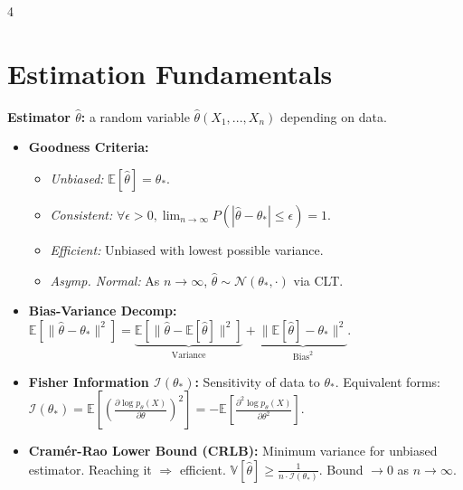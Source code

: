 \documentclass[9pt]{extarticle}
\begin{document}
\begin{multicols*}{4}
  
\section*{Estimation Fundamentals}
\textbf{Estimator $\hat{\theta}$:} a random variable $\hat{\theta}(X_1, ..., X_n)$ depending on data.
\begin{itemize}
    \item \textbf{Goodness Criteria:}
    \begin{itemize}
        \item \textit{Unbiased:} $\mathbb{E}[\hat{\theta}] = \theta_*$.
        \item \textit{Consistent:} $\forall \epsilon > 0, \lim_{n\to\infty}P(|\hat{\theta} - \theta_*|\leq\epsilon)=1$.
        \item \textit{Efficient:} Unbiased with lowest possible variance. 
        \item \textit{Asymp. Normal:} As $n\to\infty$, $\hat{\theta} \sim \mathcal{N}(\theta_*,\cdot)$ via CLT. 
    \end{itemize}
    \item \textbf{Bias-Variance Decomp:} 
    $\mathbb{E}[\|\hat{\theta} - \theta_*\|^2] = \underbrace{\mathbb{E}[\|\hat{\theta} - \mathbb{E}[\hat{\theta}]\|^2]}_{\text{Variance}} + \underbrace{\|\mathbb{E}[\hat{\theta}] - \theta_*\|^2}_{\text{Bias}^2}$.
    \item \textbf{Fisher Information $\mathcal{I}(\theta_*)$:} Sensitivity of data to $\theta_*$. Equivalent forms:
    $\mathcal{I}(\theta_*) = \mathbb{E}\!\left[\left(\frac{\partial \log p_\theta(X)}{\partial\theta}\right)^2\right] = -\mathbb{E}\!\left[\frac{\partial^2 \log p_\theta(X)}{\partial \theta^2}\right]$. 
    \item \textbf{Cramér-Rao Lower Bound (CRLB):} Minimum variance for unbiased estimator. Reaching it $\Rightarrow$ efficient.
    $\mathbb{V}[\hat{\theta}] \ge \frac{1}{n \cdot \mathcal{I}(\theta_*)}$. Bound $\to 0$ as $n \to \infty$.
\end{itemize}
 

\end{multicols*}
\end{document}
